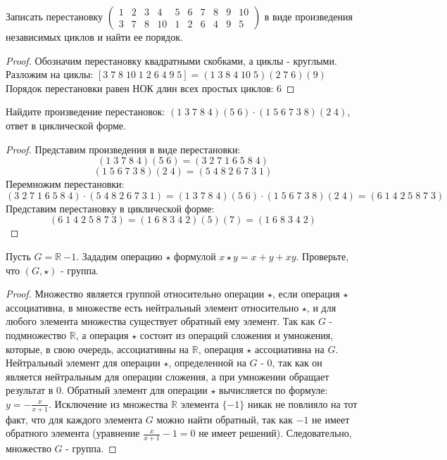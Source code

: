 \begin{problem}
	Записать перестановку
	$\begin{pmatrix}
	1 & 2 & 3 & 4 & 5 & 6 & 7 & 8 & 9 & 10\\
	3 & 7 & 8 & 10 & 1 & 2 & 6 & 4 & 9 & 5
	\end{pmatrix}$ в виде произведения независимых циклов и найти ее порядок.
\end{problem}

\begin{proof}
	Обозначим перестановку квадратными скобками, а циклы - круглыми.
	Разложим на циклы: $[3\;7\;8\;10\;1\;2\;6\;4\;9\;5]=(1\;3\;8\;4\;10\;5)(2\;7\;6)(9)$
	\newline
	Порядок перестановки равен НОК длин всех простых циклов: $6$
\end{proof}

\begin{problem}
	Найдите произведение перестановок: $(1\;3\;7\;8\;4)(5\;6)\cdot(1\;5\;6\;7\;3\;8)(2\;4)$, ответ в циклической форме.
\end{problem}

\begin{proof}
	Представим произведения в виде перестановки:
	\[
		(1\;3\;7\;8\;4)(5\;6) = (3\;2\;7\;1\;6\;5\;8\;4)
	\]
	\[
		(1\;5\;6\;7\;3\;8)(2\;4) = (5\;4\;8\;2\;6\;7\;3\;1)
	\]
	Перемножим перестановки:
	\[
		(3\;2\;7\;1\;6\;5\;8\;4)\cdot(5\;4\;8\;2\;6\;7\;3\;1) = (1\;3\;7\;8\;4)(5\;6)\cdot(1\;5\;6\;7\;3\;8)(2\;4) = (6\;1\;4\;2\;5\;8\;7\;3)
	\]
	Представим перестановку в циклической форме:
	\[
		(6\;1\;4\;2\;5\;8\;7\;3) = (1\;6\;8\;3\;4\;2)(5)(7) = (1\;6\;8\;3\;4\;2)
	\]
\end{proof}

\begin{problem}
	Пусть $G = \mathbb {R} \ {-1}$. Зададим операцию $\star$ формулой $x\star y = x + y + xy$. Проверьте, что $(G,\star)$ - группа.
\end{problem}

\begin{proof}
	Множество является группой относительно операции $\star$, если операция $\star$ ассоциативна, в множестве есть нейтральный элемент относительно $\star$, и для любого элемента множества существует обратный ему элемент.
	\newline
	Так как $G$ - подмножество $\mathbb {R}$, а операция $\star$ состоит из операций сложения и умножения, которые, в свою очередь, ассоциативны на $\mathbb {R}$, операция $\star$ ассоциативна на $G$.
	\newline
	Нейтральный элемент для операции $\star$, определенной на $G$ - $0$, так как он является нейтральным для операции сложения, а при умножении обращает результат в $0$.
	\newline
	Обратный элемент для операции $\star$ вычисляется по формуле: $y=-\frac{x}{x+1}$. Исключение из множества $\mathbb {R}$ элемента $\{-1\}$ никак не повлияло на тот факт, что для каждого элемента $G$ можно найти обратный, так как $-1$ не имеет обратного элемента (уравнение $\frac{x}{x+1}-1=0$ не имеет решений).
	\newline
	Следовательно, множество $G$ - группа.
\end{proof}

